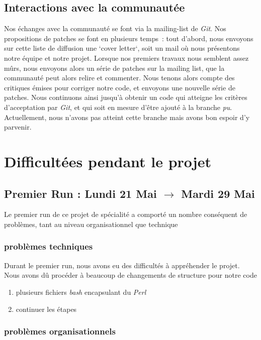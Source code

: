 \documentclass[11pt]{article}
\begin{document}
\subsection{Interactions avec la communautée}

Nos échanges avec la communauté se font via la mailing-list de
\textit{Git}. Nos propositions de patches se font en plusieurs temps~:
tout d'abord, nous envoyons sur cette liste de diffusion une `cover
letter`, soit un mail où nous présentons notre équipe et notre
projet. Lorsque nos premiers travaux nous semblent assez mûrs, nous
envoyons alors un série de patches sur la mailing list, que la
communauté peut alors relire et commenter. Nous tenons alors compte
des critiques émises pour corriger notre code, et envoyons une
nouvelle série de patches. Nous continuons ainsi jusqu'à obtenir un
code qui atteigne les critères d'acceptation par \textit{Git}, et qui
soit en mesure d'être ajouté à la branche \textit{pu}.
Actuellement, nous n'avons pas atteint cette branche mais avons bon
espoir d'y parvenir.

\section{Difficultées pendant le projet}

\subsection{Premier Run : Lundi 21 Mai $\rightarrow$ Mardi 29 Mai}

Le premier run de ce projet de spécialité a comporté un nombre conséquent de problèmes, tant au niveau organisationnel que technique

\subsubsection{problèmes techniques}

Durant le premier run, nous avons eu des difficultés à appréhender le projet. Nous avons dû procéder à beaucoup de changements de structure pour notre code
\begin{enumerate}
\item plusieurs fichiers \textit{bash} encapsulant du \textit{Perl}
\item continuer les étapes
\end{enumerate}

\subsubsection{problèmes organisationnels}
\end{document}
